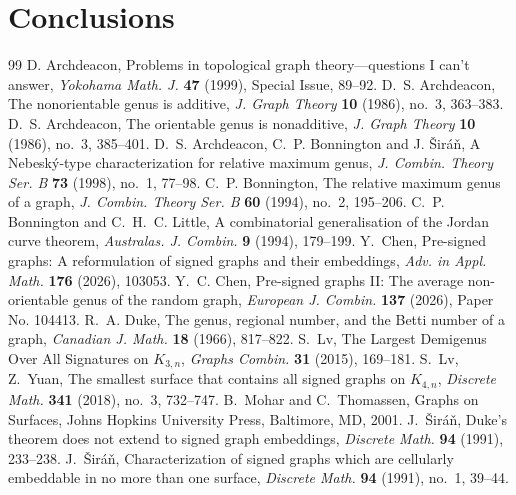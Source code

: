 \documentclass[10pt,a4paper]{amsart}
\begin{document}
\section{Conclusions}\label{Sec:5}


\begin{thebibliography}{99}
 D. Archdeacon, Problems in topological graph theory---questions I can't answer, \emph{Yokohama Math. J.} \textbf{47} (1999), Special Issue, 89--92.
 D.~S. Archdeacon, The nonorientable genus is additive, \emph{J. Graph Theory} {\bf 10} (1986), no.~3, 363--383.
 D.~S. Archdeacon, The orientable genus is nonadditive, \emph{J. Graph Theory} {\bf 10} (1986), no.~3, 385--401.
 D.~S. Archdeacon, C.~P. Bonnington and J. \v Sir\'a\v n, A Nebesk\'y-type characterization for relative maximum genus, \emph{J. Combin. Theory Ser. B} {\bf 73} (1998), no.~1, 77--98.
 C.~P. Bonnington, The relative maximum genus of a graph, \emph{J. Combin. Theory Ser. B} {\bf 60} (1994), no.~2, 195--206.
 C.~P. Bonnington and C.~H.~C. Little, A combinatorial generalisation of the Jordan curve theorem, \emph{Australas. J. Combin.} {\bf 9} (1994), 179--199.
 Y.~Chen, Pre-signed graphs: A reformulation of signed graphs and their embeddings, \emph{Adv. in Appl. Math.} \textbf{176} (2026), 103053.
 Y.~C. Chen, Pre-signed graphs II: The average non-orientable genus of the random graph, \emph{European J. Combin.} {\bf 137} (2026), Paper No. 104413.
 R.~A. Duke, The genus, regional number, and the Betti number of a graph, \emph{Canadian J. Math.} \textbf{18} (1966), 817--822.
 S.~Lv, The Largest Demigenus Over All Signatures on $K_{3,n}$, \emph{Graphs Combin.} \textbf{31} (2015), 169--181.
 S.~Lv, Z.~Yuan, The smallest surface that contains all signed graphs on $K_{4,n}$, \emph{Discrete Math.} \textbf{341} (2018), no.~3, 732--747.
 B.~Mohar and C.~Thomassen, Graphs on Surfaces, Johns Hopkins University Press, Baltimore, MD, 2001.
 J.~\v{S}ir\'a\v{n}, Duke's theorem does not extend to signed graph embeddings, \emph{Discrete Math.} \textbf{94} (1991), 233--238.
 J.~\v Sir\'a\v n, Characterization of signed graphs which are cellularly embeddable in no more than one surface, \emph{Discrete Math.} {\bf 94} (1991), no.~1, 39--44.

\end{thebibliography}
\end{document}
